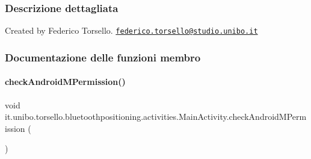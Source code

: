\subsubsection{Descrizione dettagliata}
Created by Federico Torsello. \href{mailto:federico.torsello@studio.unibo.it}{\tt federico.\+torsello@studio.\+unibo.\+it} 

\subsubsection{Documentazione delle funzioni membro}
\hypertarget{classit_1_1unibo_1_1torsello_1_1bluetoothpositioning_1_1activities_1_1MainActivity_ab762aac3d11f5b0ccc6042a140804d5d_ab762aac3d11f5b0ccc6042a140804d5d}{}\label{classit_1_1unibo_1_1torsello_1_1bluetoothpositioning_1_1activities_1_1MainActivity_ab762aac3d11f5b0ccc6042a140804d5d_ab762aac3d11f5b0ccc6042a140804d5d} 
\paragraph{\texorpdfstring{check\+Android\+M\+Permission()}{checkAndroidMPermission()}}
{\footnotesize\ttfamily void it.\+unibo.\+torsello.\+bluetoothpositioning.\+activities.\+Main\+Activity.\+check\+Android\+M\+Permission (\begin{DoxyParamCaption}{ }\end{DoxyParamCaption})\hspace{0.3cm}{\ttfamily [private]}}


